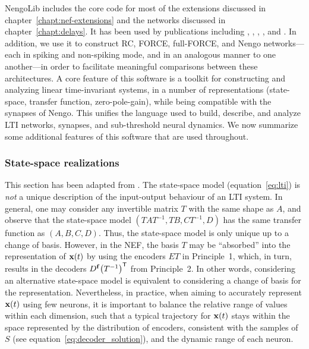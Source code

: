 
NengoLib includes the core code for most of the extensions discussed in chapter~\ref{chapt:nef-extensions} and the networks discussed in chapter~\ref{chapt:delays}.
It has been used by publications including
\citet{knight2016}, \citet{voelker2016a}, \citet{voelker2017iscas}, \citet{voelker2017neuromorphic}, and \citet{voelker2018}.
In addition, we use it to construct RC, FORCE, full-FORCE, and Nengo networks---each in spiking and non-spiking mode, and in an analogous manner to one another---in order to facilitate meaningful comparisons between these architectures.
A core feature of this software is a toolkit for constructing and analyzing linear time-invariant systems, in a number of representations (state-space, transfer function, zero-pole-gain), while being compatible with the synapses of Nengo.
This unifies the language used to build, describe, and analyze LTI networks, synapses, and sub-threshold neural dynamics.
We now summarize some additional features of this software that are used throughout.

\subsubsection{State-space realizations}

This section has been adapted from \citet[][appendix~A.3]{voelker2018}.
The state-space model (equation~\ref{eq:lti}) is \emph{not} a unique description of the input-output behaviour of an LTI system.
In general, one may consider any invertible matrix $T$ with the same shape as $A$, and observe that the state-space model $(TAT^{-1}\text{,}\, TB\text{,}\, CT^{-1}\text{,}\, D)$ has the same transfer function as $(A\text{,}\, B\text{,}\, C\text{,}\, D)$.
Thus, the state-space model is only unique up to a change of basis.
However, in the NEF, the basis $T$ may be ``absorbed'' into the representation of $\mathbf{x}(t)$ by using the encoders $ET$ in Principle~1, which, in turn, results in the decoders $D^{\mathbf{f}} {\left(T^{-1}\right)}^\mathsf{T}$ from Principle~2.
In other words, considering an alternative state-space model is equivalent to considering a change of basis for the representation.
Nevertheless, in practice, when aiming to accurately represent $\mathbf{x}(t)$ using few neurons, it is important to balance the relative range of values within each dimension, such that a typical trajectory for $\mathbf{x}(t)$ stays within the space represented by the distribution of encoders, consistent with the samples of $S$ (see equation~\ref{eq:decoder_solution}), and the dynamic range of each neuron.

